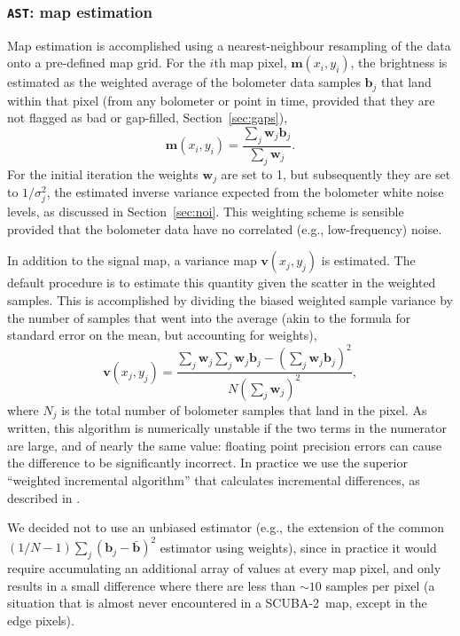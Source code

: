 \documentclass[useAMS,usenatbib,nofootinbib]{mn2e}
\newcommand{\scuba}{SCUBA-2}
\newcommand{\model}[1]{\texttt{#1}}
\begin{document}
\subsubsection{\model{AST}: map estimation}
\label{sec:ast}

Map estimation is accomplished using a nearest-neighbour resampling of
the data onto a pre-defined map grid. For the $i$th map pixel,
$\mathbf{m}(x_i,y_i)$, the brightness is estimated as the weighted
average of the bolometer data samples $\mathbf{b}_j$ that land within
that pixel (from any bolometer or point in time, provided that they
are not flagged as bad or gap-filled, Section~\ref{sec:gaps}),
%
\begin{equation}
  \mathbf{m}(x_i,y_i) = \frac{\sum_j \mathbf{w}_j \mathbf{b}_j }
                             { \sum_j \mathbf{w}_j } .
\end{equation}
%
For the initial iteration the weights $\mathbf{w}_j$ are set to 1, but
subsequently they are set to $1/\sigma_j^2$, the estimated inverse
variance expected from the bolometer white noise levels, as discussed
in Section~\ref{sec:noi}. This weighting scheme is sensible provided
that the bolometer data have no correlated (e.g., low-frequency)
noise.

In addition to the signal map, a variance map $\mathbf{v}(x_j,y_j)$ is
estimated. The default procedure is to estimate this quantity given
the scatter in the weighted samples. This is accomplished by dividing
the biased weighted sample variance by the number of samples that went
into the average (akin to the formula for standard error on the mean,
but accounting for weights),
%
\begin{equation}
\label{eq:varmap}
\mathbf{v}(x_j,y_j) = \frac{\sum_j \mathbf{w}_j
                            \sum_j \mathbf{w}_j \mathbf{b}_j -
                            \left( \sum_j \mathbf{w}_j \mathbf{b}_j \right)^2 }
                           { N \left( \sum_j \mathbf{w}_j \right)^2 },
\end{equation}
%
where $N_j$ is the total number of bolometer samples that land in the
pixel. As written, this algorithm is numerically unstable if the two
terms in the numerator are large, and of nearly the same value:
floating point precision errors can cause the difference to be
significantly incorrect. In practice we use the superior ``weighted
incremental algorithm'' that calculates incremental differences, as
described in \citet{west1979}.

We decided not to use an unbiased estimator (e.g., the extension of
the common $(1/N-1)\sum_j (\mathbf{b}_j - \bar{\mathbf{b}})^2$
estimator using weights), since in practice it would require
accumulating an additional array of values at every map pixel, and
only results in a small difference where there are less than $\sim10$
samples per pixel (a situation that is almost never encountered in a
\scuba\ map, except in the edge pixels).
\end{document}
